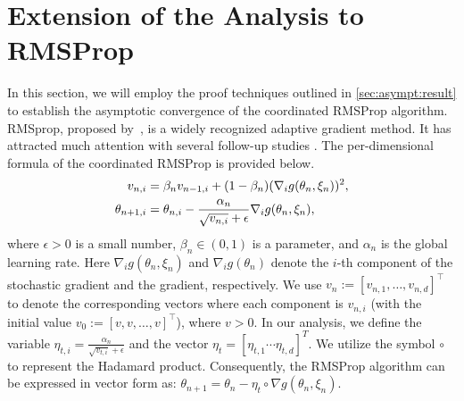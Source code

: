 \documentclass[standalone]{article}
\begin{document}
\section{Extension of the Analysis to RMSProp}\label{sec:AdaGrad:coordinate}
In this section, we will employ the proof techniques outlined in \cref{sec:asympt:result} to establish the asymptotic convergence of the coordinated RMSProp algorithm. RMSprop, proposed by~\cite{RMSProp}, is a widely recognized adaptive gradient method. It has attracted much attention with several follow-up studies \citep{xu2021convergence,shi2021rmsprop}. The per-dimensional formula of the coordinated RMSProp is provided below. %
\begin{align}\label{RMSProp}
   v_{n,i} &= \beta_n v_{n-1,i} + (1 - \beta_n) (\nabla_i g(\theta_{n},\xi_{n}))^2, \notag\\
   \theta_{n+1,i} &= \theta_{n,i} - \frac{\alpha_{n}}{\sqrt{v_{n,i}} + \epsilon}\nabla_i g(\theta_{n}, \xi_{n}),
\end{align}
where \( \epsilon > 0 \) is a small number, \( \beta_{n} \in (0,1) \) is a parameter, and \( \alpha_{n} \) is the global learning rate. Here \( \nabla_{i}g(\theta_{n}, \xi_{n}) \) and \( \nabla_{i} g(\theta_{n}) \) denote the \( i \)-th component of the stochastic gradient and the gradient, respectively. We use \( v_{n} := [v_{n,1}, \dots, v_{n,d}]^{\top} \) to denote the corresponding vectors where each component is $v_{n,i}$ (with the initial value \( v_{0} := [v, v, \ldots, v]^{\top} \)), where $v > 0$. In our analysis, we define the variable $\eta_{t,i} = \frac{\alpha_n}{\sqrt{v_{t,i}} + \epsilon}$ and the vector $\eta_t = [\eta_{t,1} \cdots \eta_{t,d}]^T$. We utilize the symbol \( \circ \) to represent the Hadamard product. Consequently, the RMSProp algorithm can be expressed in vector form as: $\theta_{n+1} = \theta_n - \eta_t \circ \nabla g(\theta_{n}, \xi_{n})$. 
\end{document}
